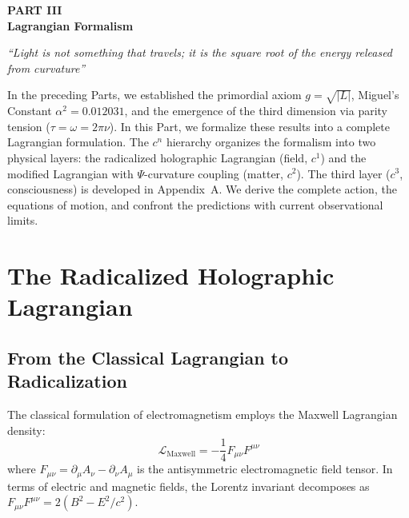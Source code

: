 \documentclass[12pt,a4paper,twoside]{article}
\newcommand{\alphaii}{\alpha^{2}}
\newcommand{\Psifield}{\Psi}
\begin{document}
\begin{center}
\vspace*{1cm}
{\huge\bfseries\color{tglblue} PART III}\\[0.5cm]
{\LARGE\bfseries\color{tglblue} Lagrangian Formalism}\\[0.3cm]
\vspace*{1cm}

{\large\itshape ``Light is not something that travels; it is the square root of the energy released from curvature''}\\[0.3cm]
\vspace*{1.5cm}
\end{center}

\noindent In the preceding Parts, we established the primordial axiom $g = \sqrt{|L|}$, Miguel's Constant $\alphaii = 0.012031$, and the emergence of the third dimension via parity tension ($\tau = \omega = 2\pi\nu$). In this Part, we formalize these results into a complete Lagrangian formulation. The $c^n$ hierarchy organizes the formalism into two physical layers: the radicalized holographic Lagrangian (field, $c^1$) and the modified Lagrangian with $\Psifield$-curvature coupling (matter, $c^2$). The third layer ($c^3$, consciousness) is developed in Appendix~A. We derive the complete action, the equations of motion, and confront the predictions with current observational limits.




\section{The Radicalized Holographic Lagrangian}


\subsection{From the Classical Lagrangian to Radicalization}

The classical formulation of electromagnetism employs the Maxwell Lagrangian density:
\begin{equation}
\mathcal{L}_{\text{Maxwell}} = -\frac{1}{4}F_{\mu\nu}F^{\mu\nu}
\label{eq:maxwell_lagrangian}
\end{equation}
where $F_{\mu\nu} = \partial_\mu A_\nu - \partial_\nu A_\mu$ is the antisymmetric electromagnetic field tensor. In terms of electric and magnetic fields, the Lorentz invariant decomposes as $F_{\mu\nu}F^{\mu\nu} = 2(B^2 - E^2/c^2)$.
\end{document}
